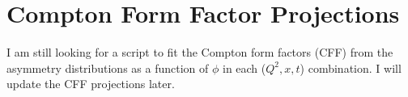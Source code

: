 \documentclass[a4paper,10.5pt]{article}
\begin{document}
% 
% 
% 

\section{Compton Form Factor Projections}
 I am still looking for a script to fit the Compton form factors (CFF) from the asymmetry distributions as a function of $\phi$ in each ($Q^{2}, x, t$) combination. I will update the CFF projections later. 
\end{document}
